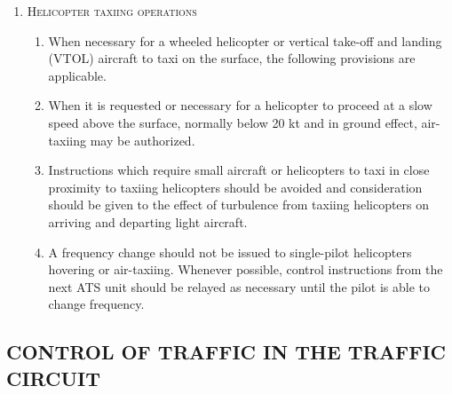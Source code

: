 \begin{enumeratesc}
\begin{enumerate}[labelindent=0pt,itemsep=0.2cm]
        \item \textsc{Helicopter taxiing operations}
        \begin{enumerate}
            \item When necessary for a wheeled helicopter or vertical take-off and landing (VTOL) aircraft to taxi on the surface, the following provisions are applicable.
            \item When it is requested or necessary for a helicopter to proceed at a slow speed above the surface, normally below 20 kt and in ground effect, air-taxiing may be authorized.
            \item Instructions which require small aircraft or helicopters to taxi in close proximity to taxiing helicopters should be avoided and consideration should be given to the effect of turbulence from taxiing helicopters on arriving and departing light aircraft.
            \item A frequency change should not be issued to single-pilot helicopters hovering or air-taxiing. Whenever possible, control instructions from the next ATS unit should be relayed as necessary until the pilot is able to change frequency.
        \end{enumerate}
    \end{enumerate}

\end{enumeratesc}

\subsection[Control of traffic in the traffic circuit]{CONTROL OF TRAFFIC IN THE TRAFFIC CIRCUIT}

